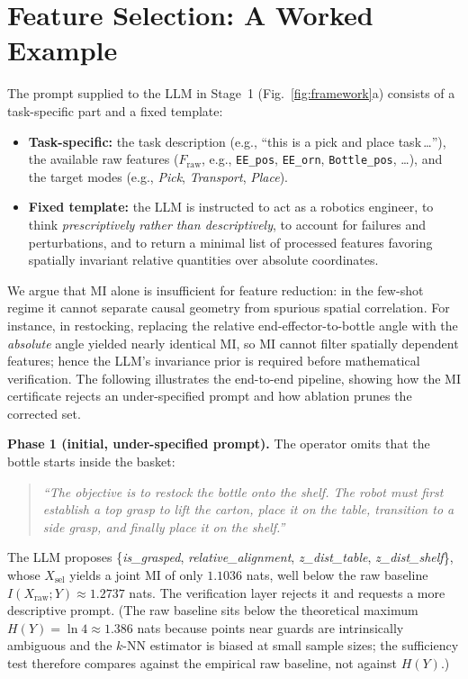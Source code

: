 \section{Feature Selection: A Worked Example}
\label{app:feature}
The prompt supplied to the LLM in Stage~1 (Fig.~\ref{fig:framework}a) consists of a task-specific part and a fixed template:
\begin{itemize}
\item \textbf{Task-specific:} the task description (e.g., ``this is a pick and place task\,\dots''), the available raw features ($F_{\text{raw}}$, e.g., \texttt{EE\_pos}, \texttt{EE\_orn}, \texttt{Bottle\_pos}, \dots), and the target modes (e.g., \textit{Pick}, \textit{Transport}, \textit{Place}).
\item \textbf{Fixed template:} the LLM is instructed to act as a robotics engineer, to think \emph{prescriptively rather than descriptively}, to account for failures and perturbations, and to return a minimal list of processed features favoring spatially invariant relative quantities over absolute coordinates.
\end{itemize}
We argue that MI alone is insufficient for feature reduction: in the few-shot regime it cannot separate causal geometry from spurious spatial correlation. For instance, in restocking, replacing the relative end-effector-to-bottle angle with the \emph{absolute} angle yielded nearly identical MI, so MI cannot filter spatially dependent features; hence the LLM's invariance prior is required before mathematical verification. The following illustrates the end-to-end pipeline, showing how the MI certificate rejects an under-specified prompt and how ablation prunes the corrected set.

\textbf{Phase 1 (initial, under-specified prompt).} The operator omits that the bottle starts inside the basket:
\begin{quote}\small\itshape ``The objective is to restock the bottle onto the shelf. The robot must first establish a top grasp to lift the carton, place it on the table, transition to a side grasp, and finally place it on the shelf.''\end{quote}
The LLM proposes \{\textit{is\_grasped}, \textit{relative\_alignment}, \textit{z\_dist\_table}, \textit{z\_dist\_shelf}\}, whose $X_{\text{sel}}$ yields a joint MI of only $1.1036$ nats, well below the raw baseline $I(X_{\text{raw}};Y)\approx1.2737$ nats. The verification layer rejects it and requests a more descriptive prompt. (The raw baseline sits below the theoretical maximum $H(Y)=\ln 4\approx1.386$ nats because points near guards are intrinsically ambiguous and the $k$-NN estimator is biased at small sample sizes; the sufficiency test therefore compares against the empirical raw baseline, not against $H(Y)$.)

